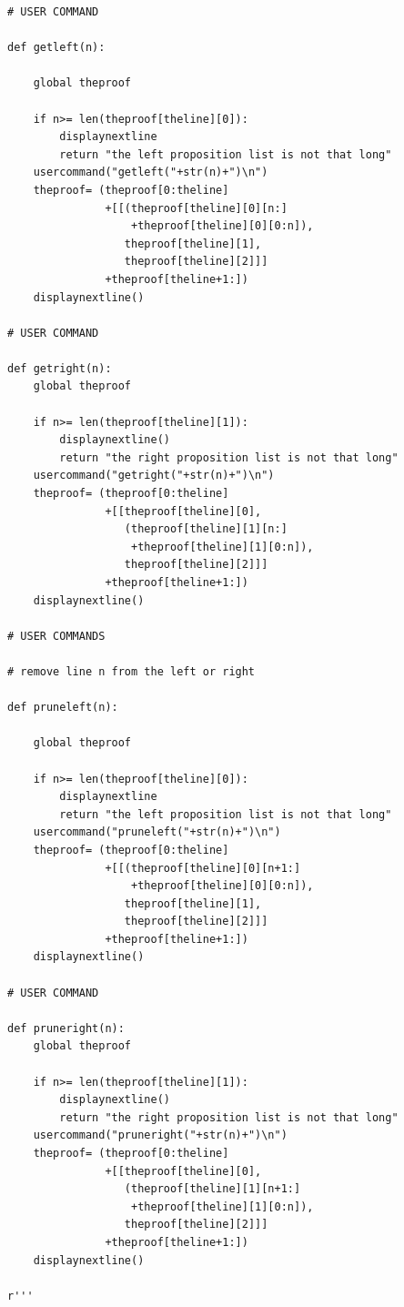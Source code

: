 \documentclass{article}
\begin{document}
\begin{verbatim}
# USER COMMAND

def getleft(n):
    
    global theproof

    if n>= len(theproof[theline][0]):
        displaynextline
        return "the left proposition list is not that long"
    usercommand("getleft("+str(n)+")\n")
    theproof= (theproof[0:theline]
               +[[(theproof[theline][0][n:]
                   +theproof[theline][0][0:n]),
                  theproof[theline][1],
                  theproof[theline][2]]]
               +theproof[theline+1:])
    displaynextline()

# USER COMMAND

def getright(n):
    global theproof

    if n>= len(theproof[theline][1]):
        displaynextline()
        return "the right proposition list is not that long"
    usercommand("getright("+str(n)+")\n")
    theproof= (theproof[0:theline]
               +[[theproof[theline][0],
                  (theproof[theline][1][n:]
                   +theproof[theline][1][0:n]),
                  theproof[theline][2]]]
               +theproof[theline+1:])
    displaynextline()

# USER COMMANDS

# remove line n from the left or right

def pruneleft(n):
    
    global theproof

    if n>= len(theproof[theline][0]):
        displaynextline
        return "the left proposition list is not that long"
    usercommand("pruneleft("+str(n)+")\n")
    theproof= (theproof[0:theline]
               +[[(theproof[theline][0][n+1:]
                   +theproof[theline][0][0:n]),
                  theproof[theline][1],
                  theproof[theline][2]]]
               +theproof[theline+1:])
    displaynextline()

# USER COMMAND

def pruneright(n):
    global theproof

    if n>= len(theproof[theline][1]):
        displaynextline()
        return "the right proposition list is not that long"
    usercommand("pruneright("+str(n)+")\n")
    theproof= (theproof[0:theline]
               +[[theproof[theline][0],
                  (theproof[theline][1][n+1:]
                   +theproof[theline][1][0:n]),
                  theproof[theline][2]]]
               +theproof[theline+1:])
    displaynextline()
    
r'''
\end{verbatim}
\end{document}

